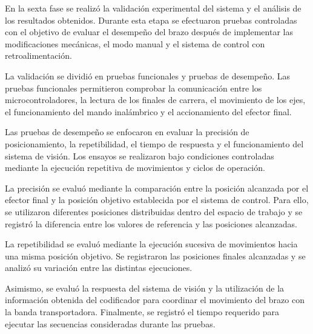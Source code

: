 
En la sexta fase se realizó la validación experimental del sistema y el análisis de los resultados obtenidos. Durante esta etapa se efectuaron pruebas controladas con el objetivo de evaluar el desempeño del brazo después de implementar las modificaciones mecánicas, el modo manual y el sistema de control con retroalimentación.

La validación se dividió en pruebas funcionales y pruebas de desempeño. Las pruebas funcionales permitieron comprobar la comunicación entre los microcontroladores, la lectura de los finales de carrera, el movimiento de los ejes, el funcionamiento del mando inalámbrico y el accionamiento del efector final.

Las pruebas de desempeño se enfocaron en evaluar la precisión de posicionamiento, la repetibilidad, el tiempo de respuesta y el funcionamiento del sistema de visión. Los ensayos se realizaron bajo condiciones controladas mediante la ejecución repetitiva de movimientos y ciclos de operación.

La precisión se evaluó mediante la comparación entre la posición alcanzada por el efector final y la posición objetivo establecida por el sistema de control. Para ello, se utilizaron diferentes posiciones distribuidas dentro del espacio de trabajo y se registró la diferencia entre los valores de referencia y las posiciones alcanzadas.

La repetibilidad se evaluó mediante la ejecución sucesiva de movimientos hacia una misma posición objetivo. Se registraron las posiciones finales alcanzadas y se analizó su variación entre las distintas ejecuciones.

Asimismo, se evaluó la respuesta del sistema de visión y la utilización de la información obtenida del codificador para coordinar el movimiento del brazo con la banda transportadora. Finalmente, se registró el tiempo requerido para ejecutar las secuencias consideradas durante las pruebas.
